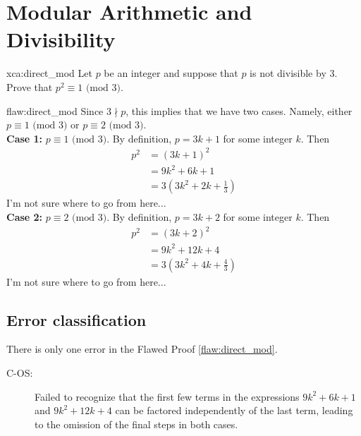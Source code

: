 \section{Modular Arithmetic and Divisibility}

\begin{xca}{xca:direct_mod}
Let $p$ be an integer and suppose that $p$ is not divisible by $3.$ Prove that $p^2 \equiv 1 \text{ (mod } 3).$
\end{xca}

\begin{flaw}{flaw:direct_mod} 
Since $3 \nmid p$, this implies that we have two cases. Namely, either \\
$p \equiv 1 \text{ (mod } 3)$ or $p \equiv 2 \text{ (mod } 3)$. \\ 

\noindent \textbf{Case 1:} $p \equiv 1 \text{ (mod } 3)$. By definition, $p = 3k+1$ for some integer $k.$ Then
\begin{align*}
    p^2 &= (3k+1)^2 \\
    &= 9k^2 + 6k +1 \\
    & = 3\left(3k^2+2k + \frac{1}{3}\right)
\end{align*}
I'm not sure where to go from here...\\

\noindent \textbf{Case 2:} $p \equiv 2 \text{ (mod } 3)$. By definition, $p = 3k+2$ for some integer $k.$ Then
\begin{align*}
    p^2 &= (3k+2)^2 \\
    &= 9k^2 + 12k +4 \\
    & = 3\left(3k^2+4k+\frac43\right)
\end{align*}
I'm not sure where to go from here...
\end{flaw}

\clearpage
\subsection{Error classification}


There is only one error
 in the Flawed Proof \ref{flaw:direct_mod}.

 
 \begin{description}
 	\item[C-OS:] Failed to recognize that the first few terms in the expressions $9k^2 + 6k +1$ and $9k^2 + 12k +4$ can be factored independently of the last term, leading to the omission of the final steps in both cases. 
 \end{description}


